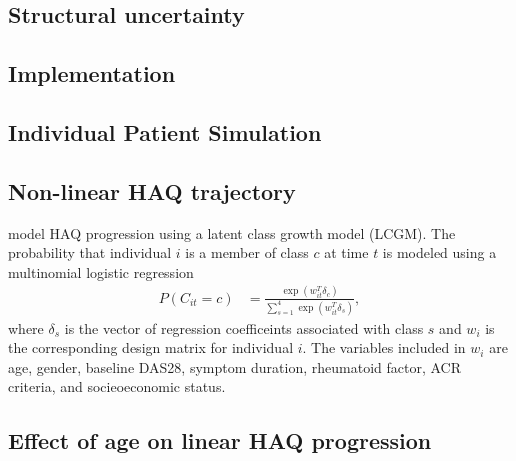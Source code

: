 \documentclass[11pt,final,fleqn]{article}\usepackage[]{graphicx}\usepackage[]{color}
\theoremstyle{plain}
\begin{document}
\subsection{Structural uncertainty}\label{stuctural-uncertainty}

\subsection{Implementation}\label{implementation}

\begin{appendices}

\section{Individual Patient Simulation}\label{appendix:IPS}
\subsection{Non-linear HAQ trajectory}\label{non-linear-haq}
\citet{norton2014health} model HAQ progression using a latent class growth model (LCGM). The probability that individual $i$ is a member of class $c$ at time $t$ is modeled using a multinomial logistic regression
\begin{align}
P(C_{it} = c) &= \frac{\exp(w_{it}^T\delta_c)}{\sum_{s=1}^{4}\exp(w_{it}^T\delta_s)},
\end{align}
where $\delta_s$ is the vector of regression coefficeints associated with class $s$ and $w_i$ is the corresponding design matrix for individual $i$. The variables included in $w_i$ are age, gender, baseline DAS28, symptom duration, rheumatoid factor, ACR criteria, and socieoeconomic status. 

\subsection{Effect of age on linear HAQ
progression}\label{effect-of-age-on-linear-haq-progression}


\end{appendices}
\end{document}
